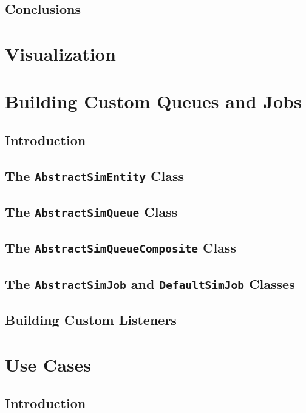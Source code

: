 \documentclass[12pt]{book}
\begin{document}
\section{Conclusions}

\chapter{Visualization}

\chapter{Building Custom Queues and Jobs}

\section{Introduction}

\section{The \lstinline{AbstractSimEntity} Class}

\section{The \lstinline{AbstractSimQueue} Class}

\section{The \lstinline{AbstractSimQueueComposite} Class}

\section{The \lstinline{AbstractSimJob} and \lstinline{DefaultSimJob} Classes}

\section{Building Custom Listeners}

\chapter{Use Cases}

\section{Introduction}
\end{document}
